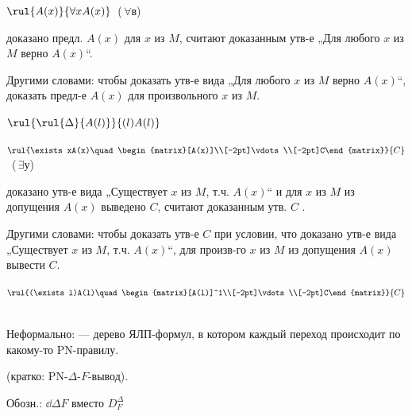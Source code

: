 \par\vspace{1mm}
$\rul{A(x)}{\forall xA(x)}$\ (\,$\forall$в)\par
{} доказано предл. $A(x)$ для  $x$ из $M$,  считают доказанным утв-е „Для любого $x$ из $M$ верно $A(x)$“.\par
Другими словами: чтобы доказать утв-е вида „Для любого $x$ из $M$ верно $A(x)$“,  доказать предл-е $A(x)$ для произвольного $x$ из $M$.\par
{}\hspace{10mm}$\rul{\rul{\Delta}{A(l)}}{(l)A(l)}$\par\vspace{3mm}
$\rul{\exists xA(x)\quad\begin{matrix}[A(x)]\\[-2pt]\vdots\\[-2pt]C\end{matrix}}{C}$\ (\,$\exists$у)\par
{} доказано утв-е вида „Существует $x$ из $M$, т.ч. $A(x)$“ и для  $x$ из $M$ из допущения $A(x)$ выведено $C$,  считают доказанным утв. $C$ .\par
Другими словами: чтобы доказать утв-е $C$  при условии, что доказано утв-е вида „Существует $x$ из $M$, т.ч. $A(x)$“,  для произв-го $x$ из $M$ из допущения $A(x)$ вывести $C$.\par
{}\hspace{10mm}$\rul{(\exists l)A(l)\quad\begin{matrix}[A(l)]^1\\[-2pt]\vdots\\[-2pt]C\end{matrix}}{C}$\ \par\vspace{3mm}
\par
Неформально:  --- дерево ЯЛП-формул, в котором каждый переход происходит по какому-то PN-правилу.\par
{}\par{} (кратко: PN-$\Delta$-$F$-вывод).\par
Обозн.: $\dd{\Delta}{F}$ вместо $D^\Delta_F$\par\vspace{1mm}
